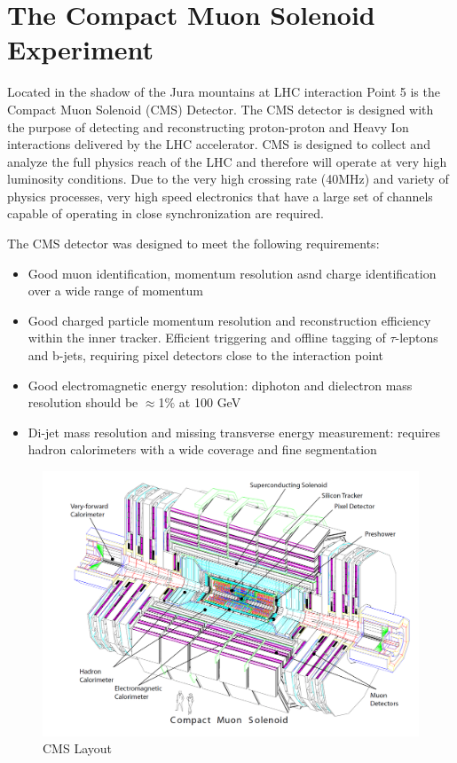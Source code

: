 \chapter{The Compact Muon Solenoid Experiment}
Located in the shadow of the Jura mountains
at LHC interaction Point 5 is the Compact Muon Solenoid (CMS) Detector. 
The CMS detector is designed with the purpose of detecting and reconstructing
proton-proton and Heavy Ion interactions delivered by the LHC accelerator.
CMS is designed to collect and analyze the full physics reach of the LHC and 
therefore will operate at very high luminosity conditions. Due to the very high
crossing rate (40MHz) and variety of physics processes, very high speed electronics
that have a large set of channels capable of operating in close synchronization are required.

The CMS detector was designed to meet the following requirements:
\begin{itemize}
\item Good muon identification, momentum resolution asnd charge identification over a wide range of momentum 
\item Good charged particle momentum resolution and reconstruction efficiency within the inner tracker. Efficient
triggering and offline tagging of $\tau$-leptons and b-jets, requiring pixel detectors close to the interaction point
\item Good electromagnetic energy resolution: diphoton and dielectron mass resolution should
be $\approx$1$\%$ at 100 GeV
\item Di-jet mass resolution and missing transverse energy measurement: requires hadron
calorimeters with a wide coverage and fine segmentation
\end{itemize}
\begin{figure}[hb]
  \centering
	\includegraphics[width=1\textwidth]{images/CMSLayout.png}
  	\caption[CMS Layout]
   	{CMS Layout}
	\label{fig:CMSLayout}
\end{figure}

